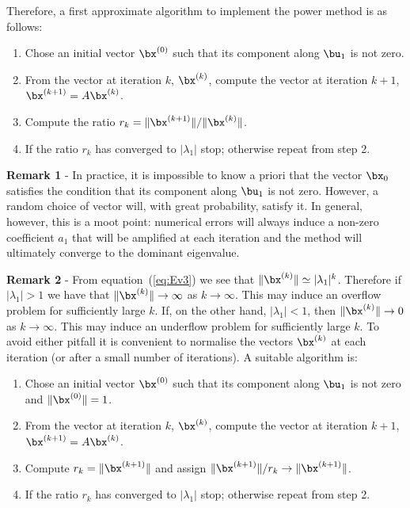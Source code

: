\noindent
Therefore, a first approximate algorithm to implement the power method
is as follows:

\begin{enumerate}
\item Chose an initial vector $\bx^{(0)}$ such that its component
  along $\bu_1$ is not zero.
\item From the vector at iteration $k$, $\bx^{(k)}$, compute the
  vector at iteration $k+1$, $\bx^{(k+1)} = A \bx^{(k)}$.
\item Compute the ratio $r_k = \| \bx^{(k+1)}\|/\| \bx^{(k)} \|$.
\item If the ratio $r_k$ has converged to $| \lambda_1|$ stop;
  otherwise repeat from step 2.
\end{enumerate}

\noindent
\textbf{Remark 1} - In practice, it is impossible to know a priori
that the vector $\bx_0$ satisfies the condition that its component
along $\bu_1$ is not zero.  However, a random choice of vector will,
with great probability, satisfy it.  In general, however, this is a
moot point: numerical errors will always induce a non-zero coefficient
$a_1$ that will be amplified at each iteration and the method will
ultimately converge to the dominant eigenvalue.

\smallskip

\noindent
\textbf{Remark 2} - From equation~(\ref{eq:Ev3}) we see that $\|
\bx^{(k)} \| \simeq | \lambda_1|^k$.  Therefore if $| \lambda_1 | > 1$
we have that $\| \bx^{(k)} \| \to \infty$ as $k \to \infty$.  This may
induce an overflow problem for sufficiently large $k$.  If, on the
other hand, $| \lambda_1 | < 1$, then $\| \bx^{(k)} \| \to 0$ as $k
\to \infty$.  This may induce an underflow problem for sufficiently
large $k$.  To avoid either pitfall it is convenient to normalise the
vectors $\bx^{(k)}$ at each iteration (or after a small number of
iterations).  A suitable algorithm is:

\begin{enumerate}
\item Chose an initial vector $\bx^{(0)}$ such that its
  component along $\bu_1$ is not zero and $\| \bx^{(0)} \| = 1$.
\item From the vector at iteration $k$, $\bx^{(k)}$, compute the
  vector at iteration $k+1$, $\bx^{(k+1)} = A \bx^{(k)}$.
\item Compute  $r_k = \| \bx^{(k+1)}\|$ and assign $\|
  \bx^{(k+1)}\|/r_k \to \| \bx^{(k+1)}\|$.
\item If the ratio $r_k$ has converged to $|\lambda_1|$ stop;
  otherwise repeat from step 2.
\end{enumerate}

